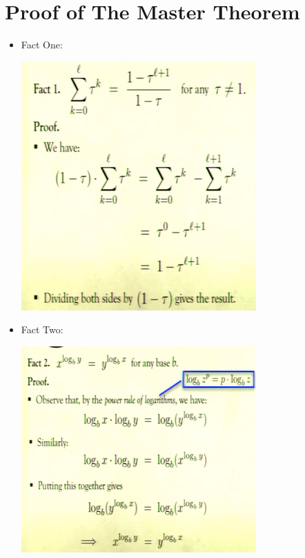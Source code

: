 \documentclass[12pt]{article}
\begin{document}
\section{Proof of The Master Theorem}
\renewcommand{\labelitemii}{$\circ$}
\renewcommand{\labelitemiii}{$\cdot$}
\renewcommand{\labelitemiii}{$\rightarrow$}
\begin{itemize}
\item Fact One:
\begin{center}
\includegraphics{lecture3c}
\end{center}
\item Fact Two:
\begin{center}
\includegraphics{lecture3d}
\end{center}


\end{itemize}
\end{document}
